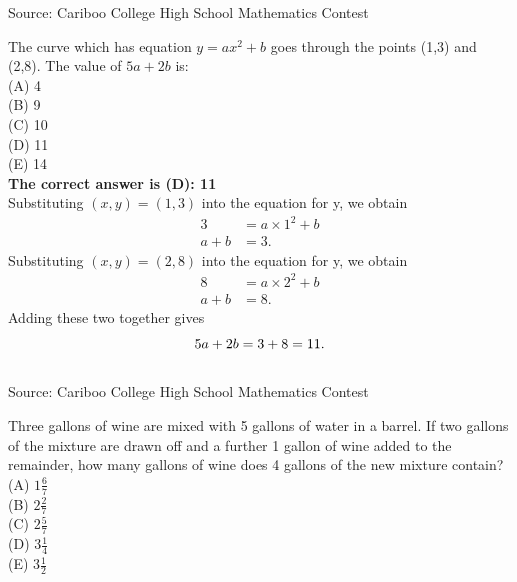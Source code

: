 \documentclass{article}
\begin{document}
\scriptsize
Source: Cariboo College High School Mathematics Contest

\normalsize
The curve which has equation $y=ax^{2}+b$ goes through the points (1,3) and (2,8). The value of $5a+2b$ is:\\
(A) 4\\
(B) 9\\
(C) 10\\
(D) 11\\
(E) 14\\

\textbf{The correct answer is (D): 11}\\[1 ex]
Substituting $(x,y)=(1,3)$ into the equation for y, we obtain
\begin{align*}
3&=a\times1^{2}+b\\
a+b&=3.
\end{align*}
Substituting $(x,y)=(2,8)$ into the equation for y, we obtain
\begin{align*}
8&=a\times2^{2}+b\\
a+b&=8.
\end{align*}
Adding these two together gives
\begin{equation*}
5a+2b=3+8=11.\\
\end{equation*}
\\[5 ex]

\scriptsize
Source: Cariboo College High School Mathematics Contest

\normalsize
Three gallons of wine are mixed with 5 gallons of water in a barrel.  If two gallons of the mixture are drawn off and a further 1 gallon of wine added to the remainder, how many gallons of wine does 4 gallons of the new mixture contain?
(A) $1\frac{6}{7}$\\[1 ex]
(B) $2\frac{2}{7}$\\[1 ex]
(C) $2\frac{5}{7}$\\[1 ex]
(D) $3\frac{1}{4}$\\[1 ex]
(E) $3\frac{1}{2}$\\
\end{document}
